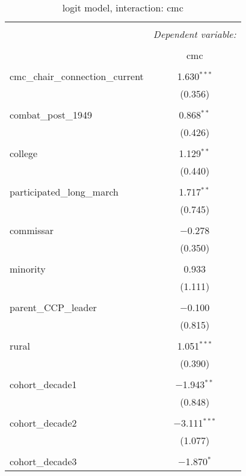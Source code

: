 \documentclass[12pt,letterpaper]{article}
\begin{document}
\begin{table}[!htbp] \centering 
	\caption{logit model, interaction: cmc} 
	\label{} 
	\rmfamily
	\scriptsize
	\begin{tabular}{@{\extracolsep{5pt}}lc} 
		\\[-1.8ex]\hline 
		\hline \\[-1.8ex] 
		& \multicolumn{1}{c}{\textit{Dependent variable:}} \\ 
		\cline{2-2} 
		\\[-1.8ex] & cmc \\ 
		\hline \\[-1.8ex] 
		cmc\_chair\_connection\_current & 1.630$^{***}$ \\ 
		& (0.356) \\ 
		& \\ 
		combat\_post\_1949 & 0.868$^{**}$ \\ 
		& (0.426) \\ 
		& \\ 
		college & 1.129$^{**}$ \\ 
		& (0.440) \\ 
		& \\ 
		participated\_long\_march & 1.717$^{**}$ \\ 
		& (0.745) \\ 
		& \\ 
		commissar & $-$0.278 \\ 
		& (0.350) \\ 
		& \\ 
		minority & 0.933 \\ 
		& (1.111) \\ 
		& \\ 
		parent\_CCP\_leader & $-$0.100 \\ 
		& (0.815) \\ 
		& \\ 
		rural & 1.051$^{***}$ \\ 
		& (0.390) \\ 
		& \\ 
		cohort\_decade1 & $-$1.943$^{**}$ \\ 
		& (0.848) \\ 
		& \\ 
		cohort\_decade2 & $-$3.111$^{***}$ \\ 
		& (1.077) \\ 
		& \\ 
		cohort\_decade3 & $-$1.870$^{*}$ \\ 

\end{tabular}
\end{table}
\end{document}
